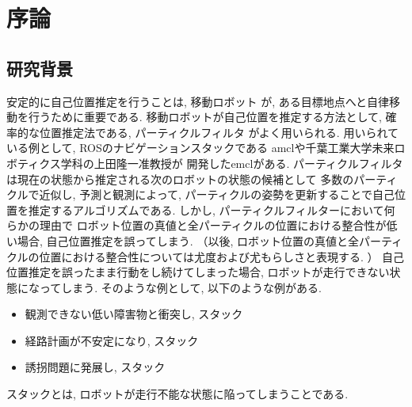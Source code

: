 \chapter{序論}

\section{研究背景}

安定的に自己位置推定を行うことは, 移動ロボット
が, ある目標地点へと自律移動を行うために重要である. 
移動ロボットが自己位置を推定する方法として,
確率的な位置推定法である, パーティクルフィルタ
がよく用いられる. 
用いられている例として, ROSのナビゲーションスタックである
amcl\cite{amcl_github}や千葉工業大学未来ロボティクス学科の上田隆一准教授が
開発したemcl\cite{emcl_github}がある. 
パーティクルフィルタは現在の状態から推定される次のロボットの状態の候補として
多数のパーティクルで近似し, 予測と観測によって,
パーティクルの姿勢を更新することで自己位置を推定するアルゴリズムである.
しかし, パーティクルフィルターにおいて何らかの理由で
ロボット位置の真値と全パーティクルの位置における整合性が低い場合, 
自己位置推定を誤ってしまう. 
（以後, ロボット位置の真値と全パーティクルの位置における整合性については尤度および尤もらしさと表現する. ）
自己位置推定を誤ったまま行動をし続けてしまった場合, 
ロボットが走行できない状態になってしまう. 
そのような例として, 以下のような例がある. 

\begin{itemize}
  \item 観測できない低い障害物と衝突し, スタック
  \item 経路計画が不安定になり, スタック
  \item 誘拐問題\cite{gutmann2002etal}に発展し, スタック
\end{itemize}

\noindent
スタックとは, ロボットが走行不能な状態に陥ってしまうことである. 

